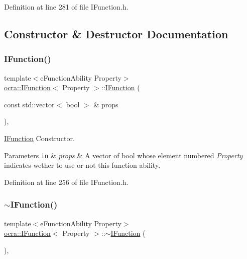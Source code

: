 Definition at line 281 of file I\+Function.\+h.



\subsection{Constructor \& Destructor Documentation}
\hypertarget{classocra_1_1IFunction_a6aa2340376a035f9b80c747b09e701fa}{}\label{classocra_1_1IFunction_a6aa2340376a035f9b80c747b09e701fa} 
\subsubsection{\texorpdfstring{I\+Function()}{IFunction()}}
{\footnotesize\ttfamily template$<$e\+Function\+Ability Property$>$ \\
\hyperlink{classocra_1_1IFunction}{ocra\+::\+I\+Function}$<$ Property $>$\+::\hyperlink{classocra_1_1IFunction}{I\+Function} (\begin{DoxyParamCaption}\item[{const std\+::vector$<$ bool $>$ \&}]{props }\end{DoxyParamCaption})\hspace{0.3cm}{\ttfamily [inline]}, {\ttfamily [protected]}}



\hyperlink{classocra_1_1IFunction}{I\+Function} Constructor. 


\begin{DoxyParams}[1]{Parameters}
\mbox{\tt in}  & {\em props} & A vector of bool whose element numbered {\itshape Property} indicates wether to use or not this function ability. \\
\hline
\end{DoxyParams}


Definition at line 256 of file I\+Function.\+h.

\hypertarget{classocra_1_1IFunction_a60204ea5f57d3f369915022c9e431e32}{}\label{classocra_1_1IFunction_a60204ea5f57d3f369915022c9e431e32} 
\subsubsection{\texorpdfstring{$\sim$\+I\+Function()}{~IFunction()}}
{\footnotesize\ttfamily template$<$e\+Function\+Ability Property$>$ \\
\hyperlink{classocra_1_1IFunction}{ocra\+::\+I\+Function}$<$ Property $>$\+::$\sim$\hyperlink{classocra_1_1IFunction}{I\+Function} (\begin{DoxyParamCaption}{ }\end{DoxyParamCaption})\hspace{0.3cm}{\ttfamily [inline]}, {\ttfamily [protected]}}




